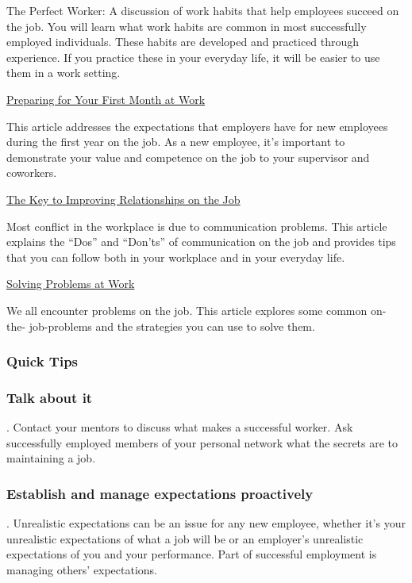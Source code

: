 The Perfect Worker: A discussion of work habits that help employees succeed on the job. You will learn what work habits are common in most successfully employed individuals. These habits are developed and practiced through experience. If you practice these in your everyday life, it will be easier to use them in a work setting.

\href{https://aphcareerconnect.org/succeed-at-work/succeeding-at-your-job/solving-problems-at-work/}{Preparing for Your First Month at Work}

This article addresses the expectations that employers have for new employees during the first year on the job. As a new employee, it's important to demonstrate your value and competence on the job to your supervisor and coworkers.

\href{https://aphcareerconnect.org/succeed-at-work/succeeding-at-your-job/solving-problems-at-work/}{The Key to Improving Relationships on the Job}

Most conflict in the workplace is due to communication problems. This article explains the ``Dos'' and ``Don'ts'' of communication on the job and provides tips that you can follow both in your workplace and in your everyday life.

\href{https://aphcareerconnect.org/succeed-at-work/succeeding-at-your-job/solving-problems-at-work/}{Solving Problems at Work}

We all encounter problems on the job. This article explores some common on- the- job-problems and the strategies you can use to solve them.

\subsubsection*{Quick Tips}
\subsubsection*{Talk about it}. Contact your mentors to discuss what makes a successful worker. Ask successfully employed members of your personal network what the secrets are to maintaining a job.

\subsubsection*{Establish and manage expectations proactively}. Unrealistic expectations can be an issue for any new employee, whether it's your unrealistic expectations of what a job will be or an employer's unrealistic expectations of you and your performance. Part of successful employment is managing others' expectations.

